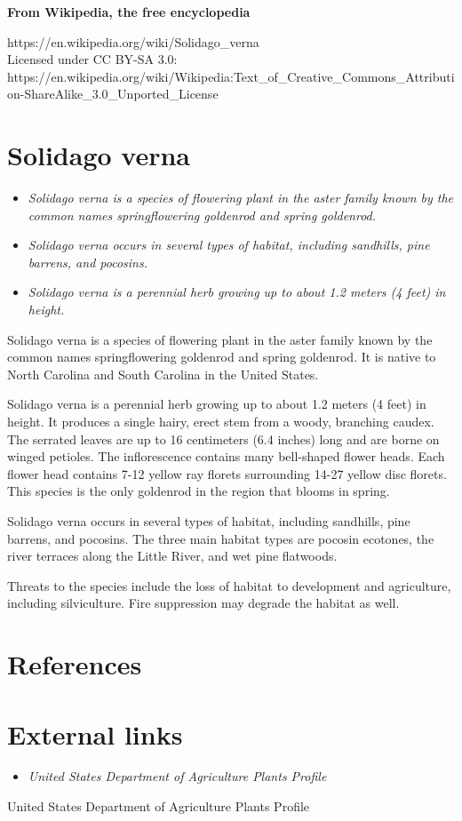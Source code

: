 \textbf{From Wikipedia, the free encyclopedia}

https://en.wikipedia.org/wiki/Solidago\_verna\\
Licensed under CC BY-SA 3.0:\\
https://en.wikipedia.org/wiki/Wikipedia:Text\_of\_Creative\_Commons\_Attribution-ShareAlike\_3.0\_Unported\_License

\section{Solidago verna}\label{solidago-verna}

\begin{itemize}
\item
  \emph{Solidago verna is a species of flowering plant in the aster
  family known by the common names springflowering goldenrod and spring
  goldenrod.}
\item
  \emph{Solidago verna occurs in several types of habitat, including
  sandhills, pine barrens, and pocosins.}
\item
  \emph{Solidago verna is a perennial herb growing up to about 1.2
  meters (4 feet) in height.}
\end{itemize}

Solidago verna is a species of flowering plant in the aster family known
by the common names springflowering goldenrod and spring goldenrod. It
is native to North Carolina and South Carolina in the United States.

Solidago verna is a perennial herb growing up to about 1.2 meters (4
feet) in height. It produces a single hairy, erect stem from a woody,
branching caudex. The serrated leaves are up to 16 centimeters (6.4
inches) long and are borne on winged petioles. The inflorescence
contains many bell-shaped flower heads. Each flower head contains 7-12
yellow ray florets surrounding 14-27 yellow disc florets. This species
is the only goldenrod in the region that blooms in spring.

Solidago verna occurs in several types of habitat, including sandhills,
pine barrens, and pocosins. The three main habitat types are pocosin
ecotones, the river terraces along the Little River, and wet pine
flatwoods.

Threats to the species include the loss of habitat to development and
agriculture, including silviculture. Fire suppression may degrade the
habitat as well.

\section{References}\label{references}

\section{External links}\label{external-links}

\begin{itemize}
\item
  \emph{United States Department of Agriculture Plants Profile}
\end{itemize}

United States Department of Agriculture Plants Profile
